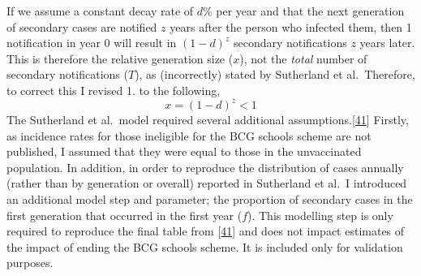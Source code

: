 \documentclass[11pt,twoside]{bristolthesis}
\begin{document}
  If we assume a constant decay rate of \(d\)\% per year and that the next generation of secondary cases are notified \(z\) years after the person who infected them, then 1 notification in year 0 will result in \((1-d)^z\) secondary notifications \(z\) years later. This is therefore the relative generation size (\(x\)), not the \emph{total} number of secondary notifications (\(T\)), as (incorrectly) stated by Sutherland et al.~Therefore, to correct this I revised 1. to the following,
  \begin{equation} 
    x = (1-d)^z < 1
  \end{equation}
  The Sutherland et al.~model required several additional assumptions.{[}\protect\hyperlink{ref-Sutherland1989}{41}{]} Firstly, as incidence rates for those ineligible for the BCG schools scheme are not published, I assumed that they were equal to those in the unvaccinated population. In addition, in order to reproduce the distribution of cases annually (rather than by generation or overall) reported in Sutherland et al.~I introduced an additional model step and parameter; the proportion of secondary cases in the first generation that occurred in the first year (\(f\)). This modelling step is only required to reproduce the final table from {[}\protect\hyperlink{ref-Sutherland1989}{41}{]} and does not impact estimates of the impact of ending the BCG schools scheme. It is included only for validation purposes.
  
\end{document}
